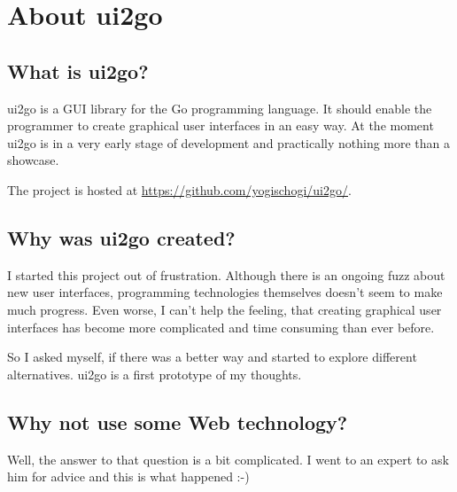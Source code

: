 \section{About ui2go}

\subsection{What is ui2go?}

ui2go is a GUI library for the Go programming language. It should enable
the programmer to create graphical user interfaces in an easy way. At
the moment ui2go is in a very early stage of development and practically
nothing more than a showcase.

The project is hosted at \url{https://github.com/yogischogi/ui2go/}.

\subsection{Why was ui2go created?}

I started this project out of frustration. Although there is an ongoing
fuzz about new user interfaces, programming technologies themselves
doesn't seem to make much progress. Even worse, I can't help the
feeling, that creating graphical user interfaces has become more
complicated and time consuming than ever before.

So I asked myself, if there was a better way and started to explore
different alternatives. ui2go is a first prototype of my thoughts.

\subsection{Why not use some Web technology?}

Well, the answer to that question is a bit complicated. I went to an
expert to ask him for advice and this is what happened :-)

